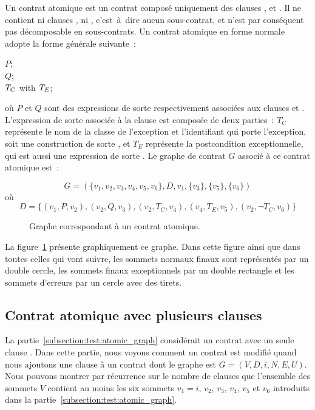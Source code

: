 Un {\strong contrat atomique} est un contrat composé uniquement des clauses
\arequires, \aensures et \athrowable. Il ne contient ni clauses \abehavior, ni
\adefault, c'est~à~dire aucun sous-contrat, et n'est par conséquent pas
décomposable en sous-contrats. Un contrat atomique en forme normale adopte
la forme générale suivante~:
%
\begin{pre}
\arequires  \(P\); \\
\aensures   \(Q\); \\
\athrowable \(T\sb{C}\) with \(T\sb{E}\);
\end{pre}
%
où $P$ et $Q$ sont des expressions de sorte  respectivement
associées aux clauses \arequires et \aensures. L'expression de sorte
 associée à la clause \athrowable est composée de
deux parties~: $T_C$ représente le nom de la classe de l'exception et
l'identifiant qui porte l'exception, soit une construction de sorte
, et $T_E$ représente la postcondition
exceptionnelle, qui est aussi une expression de sorte . Le
graphe de contrat $G$ associé à ce contrat atomique est~:


$$G = (
  \{v_1, v_2, v_3, v_4, v_5, v_6\},
  D,
  v_1,
  \{v_3\},
  \{v_5\},
  \{v_6\}
)$$
%
où
%
$$D = \{
  (v_1, P, v_2),
  (v_2, Q, v_3),
  (v_2, T_C, v_4),
  (v_4, T_E, v_5),
  (v_2, \neg T_C, v_6)
\}$$

\begin{figure}


\caption{\label{figure:test:atomic_graph} Graphe correspondant à un contrat
atomique.}

\end{figure}

La figure~\ref{figure:test:atomic_graph} présente graphiquement ce graphe. Dans
cette figure ainsi que dans toutes celles qui vont suivre, les sommets normaux
finaux sont représentés par un double cercle, les sommets finaux exceptionnels
par un double rectangle et les sommets d'erreurs par un cercle avec des tirets.

\subsection{Contrat atomique avec plusieurs clauses \athrowable}
\label{subsection:test:throwable_graph}

La partie~\ref{subsection:test:atomic_graph} considérait un contrat avec un
seule clause \athrowable. Dans cette partie, nous voyons comment un contrat est
modifié quand nous ajoutons une clause  à un
contrat dont le graphe est $G = (V, D, i, N, E, U)$. Nous pouvons montrer par
récurrence sur le nombre de clauses \athrowable que l'ensemble des sommets $V$
contient au moins les six sommets $v_1 = i$, $v_2$, $v_3$, $v_4$, $v_5$ et $v_6$
introduits dans la partie~\ref{subsection:test:atomic_graph}.

